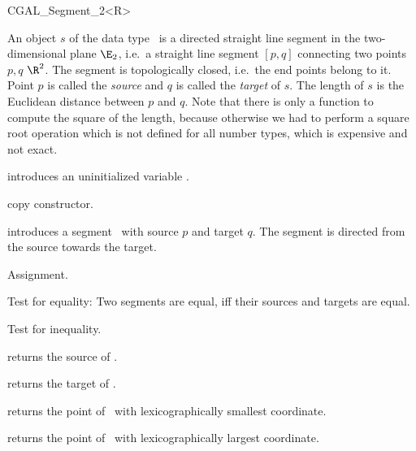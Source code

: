 
\begin{ccClassTemplate} {CGAL_Segment_2<R>}

\ccDefinition  An object $s$ of the data type \ccClassName\ is a directed
straight line segment in the two-dimensional plane $\E_2$, i.e.\ a
straight line segment $[p,q]$ connecting two points $p,q$ 
$\R^2$. The segment is topologically closed, i.e.\  the end
points belong to it. Point $p$ is called the {\em source} and $q$
is called the {\em target} of $s$. The length of $s$ is the
Euclidean distance between $p$ and $q$. Note that there is only a function
to compute the square of the length, because otherwise we had to
perform a square root operation which is not defined for all
number types, which is expensive and not exact.

\ccCreation
{}


\ccHidden {}
             {introduces an uninitialized variable \ccVar.}

\ccHidden {}
            {copy constructor.}

            {introduces a segment \ccVar\ with source $p$
             and target $q$. The segment is directed from the source towards
             the target.}


\ccOperations
\ccSetTwoOfThreeColumns{5cm}{4cm}

\ccHidden {}
        {Assignment.}

       {Test for equality: Two segments are equal, iff their sources and
        targets are equal.}

       {Test for inequality.}


       {returns the source of \ccVar.}

       {returns the target of \ccVar.}

       {returns the point of \ccVar\ with lexicographically smallest coordinate.}

       {returns the point of \ccVar\ with lexicographically largest coordinate.}



\end{ccClassTemplate}
